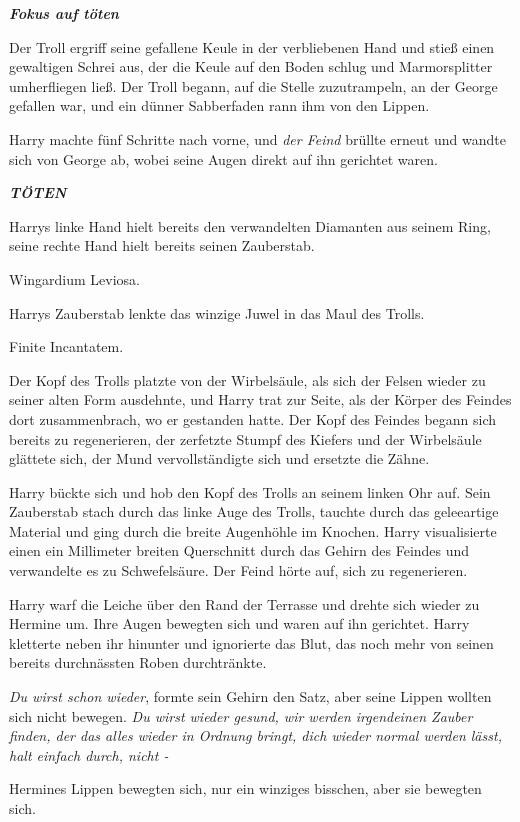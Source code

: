 \textbf{\emph{Fokus auf töten }}

Der Troll ergriff seine gefallene Keule in der verbliebenen Hand und stieß einen
gewaltigen Schrei aus, der die Keule auf den Boden schlug und Marmorsplitter
umherfliegen ließ. Der Troll begann, auf die Stelle zuzutrampeln, an der George
gefallen war, und ein dünner Sabberfaden rann ihm von den Lippen.

Harry machte fünf Schritte nach vorne, und \emph{der Feind }brüllte erneut und
wandte sich von George ab, wobei seine Augen direkt auf ihn gerichtet waren.

\textbf{\emph{TÖTEN}}

Harrys linke Hand hielt bereits den verwandelten Diamanten aus seinem Ring,
seine rechte Hand hielt bereits seinen Zauberstab.

\glqq Wingardium Leviosa.\grqq{}

Harrys Zauberstab lenkte das winzige Juwel in das Maul des Trolls.

\glqq Finite Incantatem.\grqq{}

Der Kopf des Trolls platzte von der Wirbelsäule, als sich der Felsen wieder zu
seiner alten Form ausdehnte, und Harry trat zur Seite, als der Körper des
Feindes dort zusammenbrach, wo er gestanden hatte. Der Kopf des Feindes begann
sich bereits zu regenerieren, der zerfetzte Stumpf des Kiefers und der
Wirbelsäule glättete sich, der Mund vervollständigte sich und ersetzte die
Zähne.

Harry bückte sich und hob den Kopf des Trolls an seinem linken Ohr auf. Sein
Zauberstab stach durch das linke Auge des Trolls, tauchte durch das geleeartige
Material und ging durch die breite Augenhöhle im Knochen. Harry visualisierte
einen ein Millimeter breiten Querschnitt durch das Gehirn des Feindes und
verwandelte es zu Schwefelsäure. Der Feind hörte auf, sich zu regenerieren.

Harry warf die Leiche über den Rand der Terrasse und drehte sich wieder zu
Hermine um. Ihre Augen bewegten sich und waren auf ihn gerichtet. Harry
kletterte neben ihr hinunter und ignorierte das Blut, das noch mehr von seinen
bereits durchnässten Roben durchtränkte.

\emph{Du wirst schon wieder}, formte sein Gehirn den Satz, aber seine Lippen
wollten sich nicht bewegen. \emph{Du wirst wieder gesund, wir werden irgendeinen
Zauber finden, der das alles wieder in Ordnung bringt, dich wieder normal werden
lässt, halt einfach durch, nicht -}

Hermines Lippen bewegten sich, nur ein winziges bisschen, aber sie bewegten
sich.

